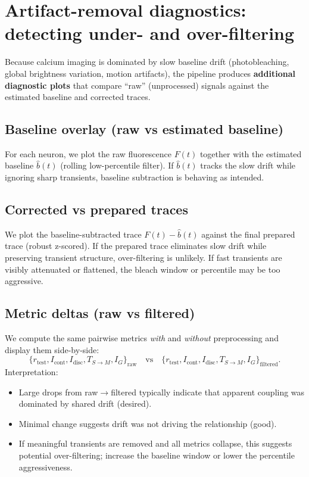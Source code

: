 \documentclass[11pt]{article}
\begin{document}
\section{Artifact-removal diagnostics: detecting under- and over-filtering}
Because calcium imaging is dominated by slow baseline drift (photobleaching, global brightness variation, motion artifacts), the pipeline produces \textbf{additional diagnostic plots} that compare ``raw'' (unprocessed) signals against the estimated baseline and corrected traces.

\subsection{Baseline overlay (raw vs estimated baseline)}
For each neuron, we plot the raw fluorescence $F(t)$ together with the estimated baseline $\hat{b}(t)$ (rolling low-percentile filter). If $\hat{b}(t)$ tracks the slow drift while ignoring sharp transients, baseline subtraction is behaving as intended.

\subsection{Corrected vs prepared traces}
We plot the baseline-subtracted trace $F(t)-\hat{b}(t)$ against the final prepared trace (robust z-scored). If the prepared trace eliminates slow drift while preserving transient structure, over-filtering is unlikely. If fast transients are visibly attenuated or flattened, the bleach window or percentile may be too aggressive.

\subsection{Metric deltas (raw vs filtered)}
We compute the same pairwise metrics \emph{with} and \emph{without} preprocessing and display them side-by-side:
\[
\{r_{\text{test}}, I_{\text{cont}}, I_{\text{disc}}, T_{S\to M}, I_G\}_{\text{raw}} \quad \text{vs} \quad
\{r_{\text{test}}, I_{\text{cont}}, I_{\text{disc}}, T_{S\to M}, I_G\}_{\text{filtered}}.
\]
Interpretation:
\begin{itemize}[leftmargin=*]
\item Large drops from raw$\to$filtered typically indicate that apparent coupling was dominated by shared drift (desired).
\item Minimal change suggests drift was not driving the relationship (good).
\item If meaningful transients are removed and all metrics collapse, this suggests potential over-filtering; increase the baseline window or lower the percentile aggressiveness.
\end{itemize}
\end{document}

